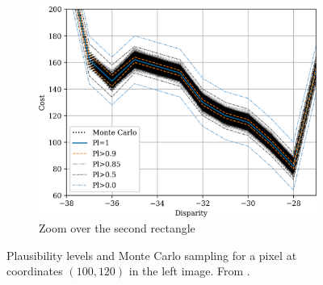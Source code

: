 \begin{figure}
\begin{subfigure}[t]{0.45\linewidth}
        \includegraphics[width=\linewidth]{Images/Chap_4/cost_curve_100_120_zoom2.png}
        \caption{Zoom over the second rectangle}
        \label{fig:montecarlo_gauss_100_120_zoom2}
    \end{subfigure}
    \caption{Plausibility levels and Monte Carlo sampling for a pixel at coordinates $(100, 120)$ in the left image. From \cite{malinowski_uncertainty_2024}.}
    \label{fig:montecarlo_gauss_100_120}
\end{figure}

